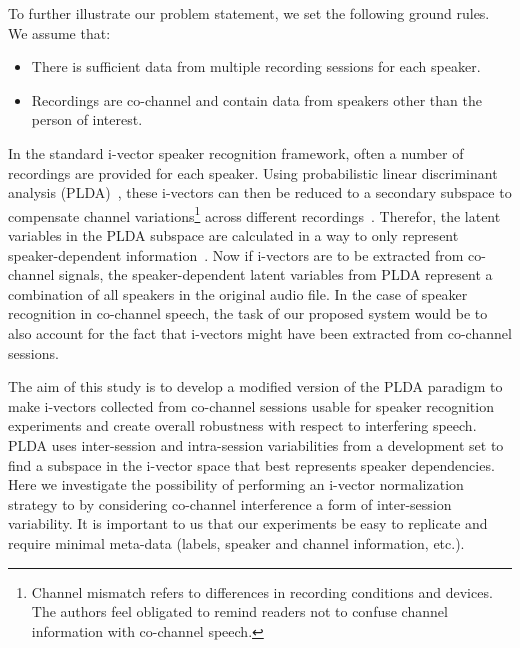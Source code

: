 \documentclass[journal]{IEEEtran}
\begin{document}
To further illustrate our problem statement, we set the following ground rules. We assume that:
\begin{itemize}
	\item There is sufficient data from multiple recording sessions for each speaker. 
	\item Recordings are co-channel and contain data from speakers other than the person of interest.
\end{itemize} 

In the standard i-vector speaker recognition framework, often a number of recordings are provided for each speaker. 
Using probabilistic linear discriminant analysis (PLDA)~\cite{prince_plda}, these i-vectors can then be reduced to a secondary subspace to compensate channel variations\footnote{Channel mismatch refers to differences in recording conditions and devices. The authors feel obligated to remind readers not to confuse channel information with co-channel speech.} across different recordings~\cite{kenny_plda,Daniel2011is}. 
Therefor, the latent variables in the PLDA subspace are calculated in a way to only represent speaker-dependent information~\cite{kenny_plda2,cumani_icassp13,burget_icassp11,yun_icassp12,matejka_icassp11}.
Now if i-vectors are to be extracted from co-channel signals, the speaker-dependent latent variables from PLDA represent a combination of all speakers in the original audio file. 
In the case of speaker recognition in co-channel speech, the task of our proposed system would be to also account for the fact that i-vectors might have been extracted from co-channel sessions. 

The aim of this study is to develop a modified version of the PLDA paradigm to make i-vectors collected from co-channel sessions usable for speaker recognition experiments and create overall robustness with respect to interfering speech. 
PLDA uses inter-session and intra-session variabilities from a development set to find a subspace in the i-vector space that best represents speaker dependencies. 
Here we investigate the possibility of performing an i-vector normalization strategy to by considering co-channel interference a form of inter-session variability.  
It is important to us that our experiments be easy to replicate and require minimal meta-data (labels, speaker and channel information, etc.). 
\end{document}
